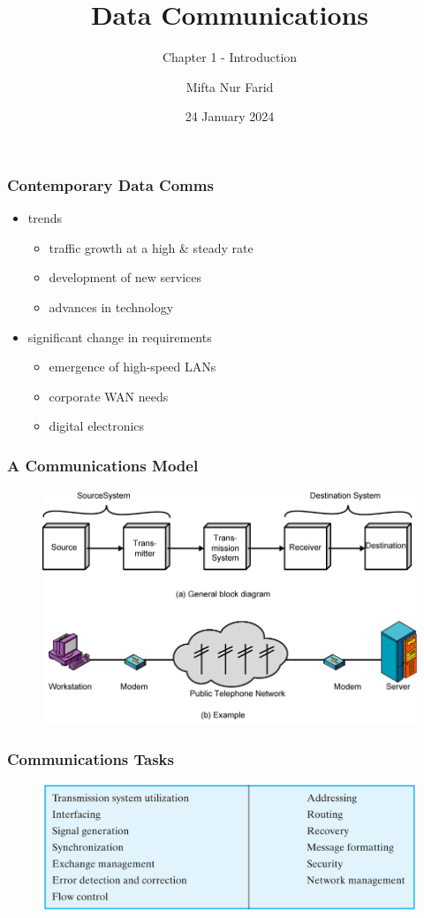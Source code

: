 \documentclass[pdflatex,compress]{beamer}
\title{Data Communications}
\subtitle{Chapter 1 - Introduction}
\author{Mifta Nur Farid}
\date{24 January 2024}
\begin{document}
\maketitle

\begin{frame}
	\frametitle{Contemporary Data Comms}
	\begin{itemize}
		\item trends
		\begin{itemize}
			\item traffic growth at a high \& steady rate
			\item development of new services
			\item advances in technology
		\end{itemize}
		\item significant change in requirements
		\begin{itemize}
			\item emergence of high-speed LANs
			\item corporate WAN needs
			\item digital electronics
		\end{itemize}
	\end{itemize}
\end{frame}

\begin{frame}
	\frametitle{A Communications Model}
	\begin{figure}
		\centering
		\includegraphics[width=\linewidth]{img/img01}
		\label{fig:img01}
	\end{figure}
\end{frame}

\begin{frame}
	\frametitle{Communications Tasks}
	\begin{figure}
		\centering
		\includegraphics[width=\linewidth]{img/img02}
		\label{fig:img02}
	\end{figure}
\end{frame}
\end{document}
